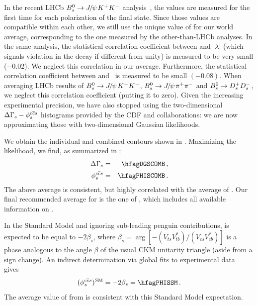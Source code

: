 In the recent LHCb $B^0_s \to {J\mskip -3mu/\mskip -2mu\psi\mskip 2mu} K^+K^-$ analysis~\cite{Aaij:2014zsa,*Aaij:2013oba_supersede2}, the \phiccbars values are measured for the first time for each polarization of the final state. Since those values are compatible within each other, we still use the unique value of \phiccbars for our world average, corresponding to the one measured by the other-than-LHCb analyses. 
In the same analysis, the statistical correlation coefficient between \phiccbars and $|\lambda|$
(which signals \CP violation in the decay if different from unity) 
is measured to be very small ($-0.02$). We neglect this correlation in our average. 
Furthermore, the statistical correlation coefficient between \phiccbars and \DGs\ is measured to be small $(-0.08)$. When averaging LHCb results of 
$B^0_s \to {J\mskip -3mu/\mskip -2mu\psi\mskip 2mu} K^+K^-$,  $B^0_s \to {J\mskip -3mu/\mskip -2mu\psi\mskip 2mu} \pi^+\pi^-$ and $B^0_s \to D_s^+ D_s^-$, we neglect this correlation coefficient (putting it to zero). 
Given the increasing experimental precision, we have also stopped using the two-dimensional $\DGs-\phiccbars$ histograms provided by the CDF and \dzero collaborations: we are now approximating those with two-dimensional Gaussian likelihoods. 

We obtain the individual and combined contours shown in . %
Maximizing the likelihood, we find, as summarized in :  
\begin{eqnarray}
\DGs &=& \hfagDGSCOMB \,, \\    
\phiccbars &=& \hfagPHISCOMB \,.
\labe{phis}
\end{eqnarray}
The above \DGs average is consistent, but highly correlated with the average
of . Our
final recommended average for \DGs is the one of , which 
includes all available information on \DGs. 

In the Standard Model and ignoring sub-leading penguin contributions, 
\phiccbars is expected to be equal to $-2\beta_s$, 
where
$\beta_s = \arg\left[-\left(V_{ts}V^*_{tb}\right)/\left(V_{cs}V^*_{cb}\right)\right]$ %
is a phase analogous to the angle $\beta$ of the usual CKM
unitarity triangle (aside from a sign change). %
An indirect determination via global fits to experimental data
gives~\cite{Charles:2011va_mod}
\begin{equation}
(\phiccbars)^{\rm SM} = -2\beta_s = \hfagPHISSM \,.
\labe{phisSM}
\end{equation}
The average value of \phiccbars from  is consistent with this
Standard Model expectation.

